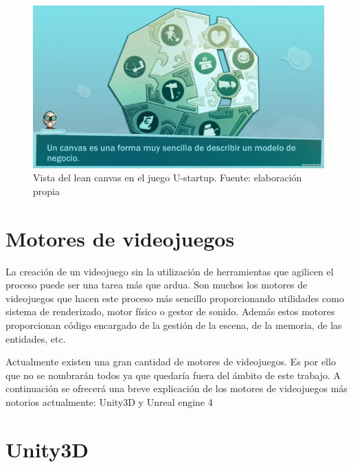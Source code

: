 \begin{description}
\begin{figure}
\begin{center}
\includegraphics[scale=0.6]{imagenes/ustartup01.jpg}
\caption{Vista del lean canvas en el juego U-startup.  Fuente: elaboración propia}
\label{ustartup01}
\end{center}
\end{figure}

\end{description}


\section{Motores de videojuegos}

La creación de un videojuego sin la utilización de herramientas que agilicen el proceso puede ser una tarea más que ardua. Son muchos los motores de videojuegos que hacen este proceso más sencillo proporcionando utilidades como sistema de renderizado, motor físico o gestor de sonido. Además estos motores proporcionan código encargado de la gestión de la escena, de la memoria, de las entidades, etc.

Actualmente existen una gran cantidad de motores de videojuegos. Es por ello que no se nombrarán todos ya que quedaría fuera del ámbito de este trabajo. A continuación se ofrecerá una breve explicación de los motores de videojuegos más notorios actualmente: Unity3D y Unreal engine 4

\section{Unity3D}

